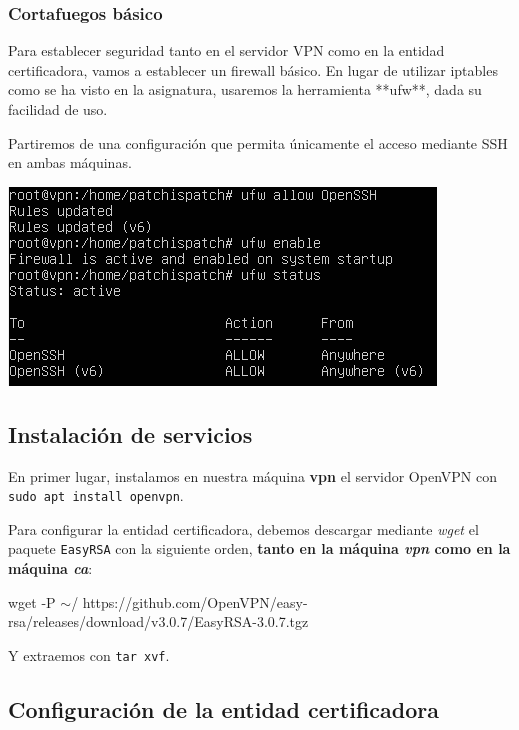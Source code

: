 \documentclass[11pt,a4paper]{article}
\begin{document}
\subsubsection{Cortafuegos básico}

Para establecer seguridad tanto en el servidor VPN como en la entidad certificadora, vamos a establecer un firewall básico. En lugar de utilizar iptables como se ha visto en la asignatura, usaremos la herramienta **ufw**, dada su facilidad de uso.

Partiremos de una configuración que permita únicamente el acceso mediante SSH en ambas máquinas.

\medskip

\begin{center}
\includegraphics[scale=0.8]{ufw-allow.png}
\end{center}

\subsection{Instalación de servicios}

En primer lugar, instalamos en nuestra máquina \textbf{vpn} el servidor OpenVPN con \texttt{sudo apt install openvpn}.

Para configurar la entidad certificadora, debemos descargar mediante \textit{wget} el paquete \texttt{EasyRSA} con la siguiente orden, \textbf{tanto en la máquina \textit{vpn} como en la máquina \textit{ca}}:

\medskip

\texttt\footnotesize{wget -P $\sim$/ https://github.com/OpenVPN/easy-rsa/releases/download/v3.0.7/EasyRSA-3.0.7.tgz}

\medskip

Y extraemos con \texttt{tar xvf}.

\subsection{Configuración de la entidad certificadora}
\end{document}
